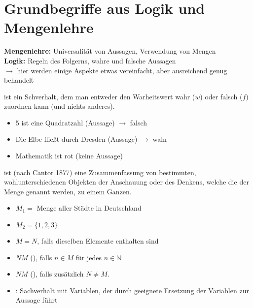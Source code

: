 \section{Grundbegriffe aus Logik und Mengenlehre}

\textbf{Mengenlehre:} Universalität von Aussagen, Verwendung von Mengen \\
\textbf{Logik:} Regeln des Folgerns, wahre und falsche Aussagen \\
$\to$ hier werden einige Aspekte etwas vereinfacht, aber ausreichend genug behandelt

\begin{*definition}[Aussage]
	 ist ein Schverhalt, dem man entweder den Warheitswert wahr ($w$) oder falsch ($f$) zuordnen kann (und nichts anderes).
\end{*definition}

\begin{example}
	\begin{itemize}
		\item 5 ist eine Quadratzahl (Aussage) $\to$ falsch
		\item Die Elbe fließt durch Dresden (Aussage) $\to$ wahr
		\item Mathematik ist rot (keine Aussage)
	\end{itemize}
\end{example}
	
\begin{*definition}[Menge]
	 ist (nach Cantor 1877) eine Zusammenfassung von bestimmten, wohlunterschiedenen Objekten der Anschauung oder des Denkens, welche die  der Menge genannt werden, zu einem Ganzen.
\end{*definition}

\begin{example}
	\begin{itemize}
		\item $M_1=$ Menge aller Städte in Deutschland
		\item $M_2=\{1,2,3\}$
	\end{itemize}
\end{example}

\begin{*definition}
	\begin{itemize}
		\item $M=N$, falls dieselben Elemente enthalten sind
		\item $N$$M$ (), falls $n\in M$ für jedes $n\in\mathbb{N}$
		\item $N$$M$ (), falls zusätzlich $N\neq M$.
		\item {}: Sachverhalt mit Variablen, der durch geeignete Ersetzung der Variablen zur Aussage führt
	\end{itemize}
\end{*definition}

